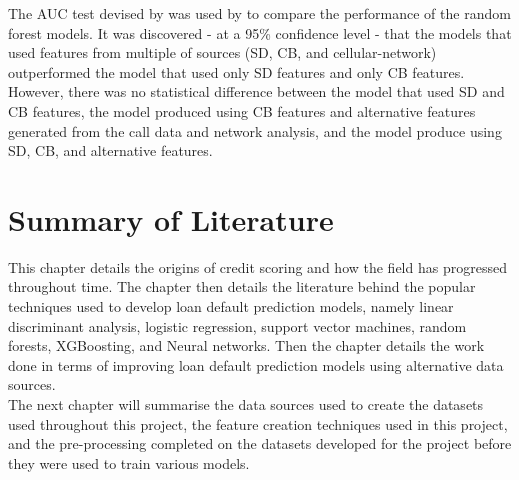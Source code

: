 The AUC test devised by \textcite{AUC} was used by \textcite{BigDataMicroFiance} to compare the performance of the random forest models. It was discovered - at a 95\% confidence level - that the models that used features from multiple of sources (SD, CB, and cellular-network) outperformed the model that used only SD features and only CB features. \\

However, there was no statistical difference between the model that used  SD and CB features, the model produced using CB features and alternative features generated from the call data and network analysis, and the model produce using SD, CB, and alternative features. \newpage

\section{Summary of Literature}

This chapter details the origins of credit scoring and how the field has progressed throughout time. The chapter then details the literature behind the popular techniques used to develop loan default prediction models, namely linear discriminant analysis, logistic regression, support vector machines, random forests, XGBoosting, and Neural networks. Then the chapter details the work done in terms of improving loan default prediction models using alternative data sources. \\

The next chapter will summarise the data sources used to create the datasets used throughout this project, the feature creation techniques used in this project, and the pre-processing completed on the datasets developed for the project before they were used to train various models. 